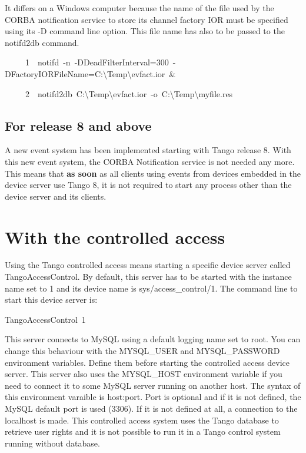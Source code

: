 It differs on a Windows computer because the name of the file used
by the CORBA notification service to store its channel factory IOR
must be specified using its -D command line option. This file name
has also to be passed to the notifd2db command.


\begin{lyxcode}
~~~~~1~~notifd~-n~-DDeadFilterInterval=300~-DFactoryIORFileName=C:\textbackslash{}Temp\textbackslash{}evfact.ior~\&

~~~~~2~~notifd2db~C:\textbackslash{}Temp\textbackslash{}evfact.ior~-o~C:\textbackslash{}Temp\textbackslash{}myfile.res
\end{lyxcode}



\subsection{For release 8 and above}

A new event system has been implemented starting with Tango release
8. With this new event system, the CORBA Notification service is not
needed any more. This means that \textbf{as soon} as all clients using
events from devices embedded in the device server use Tango 8, it
is not required to start any process other than the device server
and its clients.


\section{With the controlled access}

Using the Tango controlled access means starting a specific device
server called TangoAccessControl. By default,
this server has to be started with the instance name set to \textquotedbl{}1\textquotedbl{}
and its device name is \textquotedbl{}sys/access\_control/1\textquotedbl{}.
The command line to start this device server is:
\begin{lyxcode}
TangoAccessControl~1
\end{lyxcode}
This server connects to MySQL using a default logging name set to
\textquotedbl{}root\textquotedbl{}. You can change this behaviour
with the MYSQL\_USER and MYSQL\_PASSWORD
environment variables. Define them before starting the controlled
access device server. This server also uses the MYSQL\_HOST
environment variable if you need to connect it to some MySQL server
running on another host. The syntax of this environment varaible is
\textquotedbl{}host:port\textquotedbl{}. Port is optional and if it
is not defined, the MySQL default port is used (3306). If it is not
defined at all, a connection to the localhost is made. This controlled
access system uses the Tango database to retrieve user rights and
it is not possible to run it in a Tango control system running without
database.
